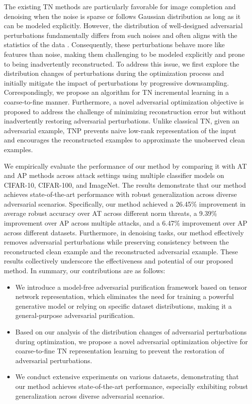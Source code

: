 The existing TN methods are particularly favorable for image completion and denoising when the noise is sparse or follows Gaussian distribution as long as it can be modeled explicitly.
However, the distribution of well-designed adversarial perturbations fundamentally differs from such noises and often aligns with the statistics of the data \citep{ilyas2019adversarial,allen2022feature}.
Consequently, these perturbations behave more like features than noise, making them challenging to be modeled explicitly and prone to being inadvertently reconstructed.
To address this issue, we first explore the distribution changes of perturbations during the optimization process and initially mitigate the impact of perturbations by progressive downsampling. 
Correspondingly, we propose an algorithm for TN incremental learning in a coarse-to-fine manner. Furthermore, a novel adversarial optimization objective is proposed to address the challenge of minimizing reconstruction error but without inadvertently restoring adversarial perturbations.
Unlike classical TN, given an adversarial example, TNP prevents naive low-rank representation of the input and encourages the reconstructed examples to approximate the unobserved clean examples.


We empirically evaluate the performance of our method by comparing it with AT and AP methods across attack settings using multiple classifier models on CIFAR-10, CIFAR-100, and ImageNet.
The results demonstrate that our method achieves state-of-the-art performance with robust generalization across diverse adversarial scenarios.
Specifically, our method achieved a 26.45\% improvement in average robust accuracy over AT across different norm threats, a 9.39\% improvement over AP across multiple attacks, and a 6.47\% improvement over AP across different datasets.
Furthermore, in denoising tasks, our method effectively removes adversarial perturbations while preserving consistency between the reconstructed clean example and the reconstructed adversarial example.
These results collectively underscore the effectiveness and potential of our proposed method.
In summary, our contributions are as follows:
\begin{itemize}
    \item We introduce a model-free adversarial purification framework based on tensor network representation, which eliminates the need for training a powerful generative model or relying on specific dataset distributions, making it a general-purpose adversarial purification.
    \item Based on our analysis of the distribution changes of adversarial perturbations during optimization, we propose a novel adversarial optimization objective for coarse-to-fine TN representation learning to prevent the restoration of adversarial perturbations.
    \item We conduct extensive experiments on various datasets, demonstrating that our method achieves state-of-the-art performance, especially exhibiting robust generalization across diverse adversarial scenarios.
\end{itemize}

